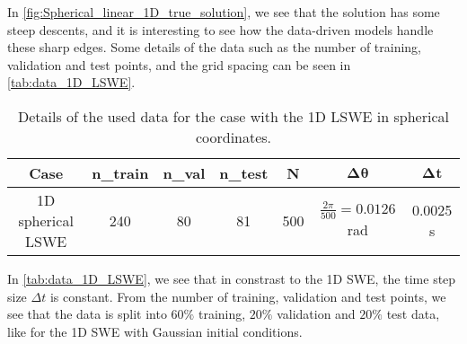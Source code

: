 In \autoref{fig:Spherical_linear_1D_true_solution}, we see that the solution has some steep descents, and it is interesting to see how the data-driven models handle these sharp edges.
Some details of the data such as the number of training, validation and test points, and the grid spacing can be seen in \autoref{tab:data_1D_LSWE}.
\begin{table}[H]
    \centering
    \begin{tabular}{c|cccccc}
        \textbf{Case} & \textbf{n\_train} & \textbf{n\_val} & \textbf{n\_test} & \textbf{N} & $\mathbf{\Delta \theta}$ & $\mathbf{\Delta t}$ \\
        \hline
        1D spherical LSWE & 240 & 80 & 81 & 500 & $\frac{2 \pi}{500} = 0.0126$ rad  & 0.0025 s \\
    \end{tabular}
    \caption{Details of the used data for the case with the 1D LSWE in spherical coordinates.}\label{tab:data_1D_LSWE}
\end{table}
In \autoref{tab:data_1D_LSWE}, we see that in constrast to the 1D SWE, the time step size $\Delta t$ is constant.
From the number of training, validation and test points, we see that the data is split into $60\%$ training, $20\%$ validation and $20\%$ test data, like for the 1D SWE with Gaussian initial conditions.

